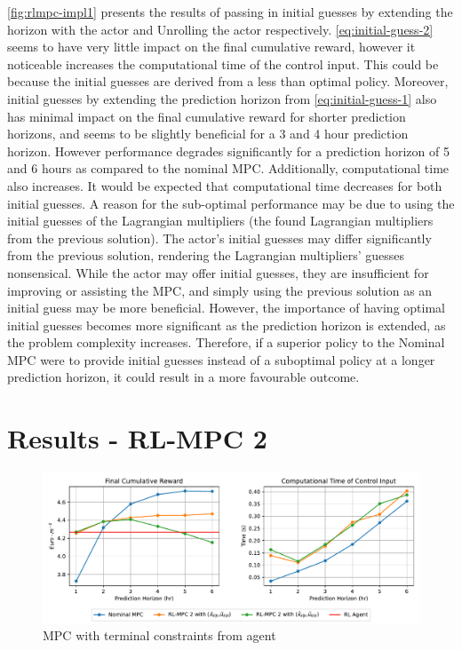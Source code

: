 \autoref{fig:rlmpc-impl1} presents the results of passing in initial guesses by extending the horizon with the actor and Unrolling the actor respectively. \autoref{eq:initial-guess-2} seems to have very little impact on the final cumulative reward, however it noticeable increases the computational time of the control input. This could be because the initial guesses are derived from a less than optimal policy. Moreover, initial guesses by extending the prediction horizon from \autoref{eq:initial-guess-1} also has minimal impact on the final cumulative reward for shorter prediction horizons, and seems to be slightly beneficial for a 3 and 4 hour prediction horizon. However performance degrades significantly for a prediction horizon of 5 and 6 hours as compared to the nominal MPC. Additionally, computational time also increases. It would be expected that computational time decreases for both initial guesses. A reason for the sub-optimal performance may be due to using the initial guesses of the Lagrangian multipliers (the found Lagrangian multipliers from the previous solution). The actor's initial guesses may differ significantly from the previous solution, rendering the Lagrangian multipliers' guesses nonsensical. While the actor may offer initial guesses, they are insufficient for improving or assisting the MPC, and simply using the previous solution as an initial guess may be more beneficial. However, the importance of having optimal initial guesses becomes more significant as the prediction horizon is extended, as the problem complexity increases. Therefore, if a superior policy to the Nominal MPC were to provide initial guesses instead of a suboptimal policy at a longer prediction horizon, it could result in a more favourable outcome.

\section{Results - RL-MPC 2}

\begin{figure}[H]
	\centering
	\includegraphics[width=\textwidth]{figures/rl_mpc_impl_2.pdf}
	\caption{MPC with terminal constraints from agent}
	\label{fig:rlmpc-impl2}
\end{figure}

